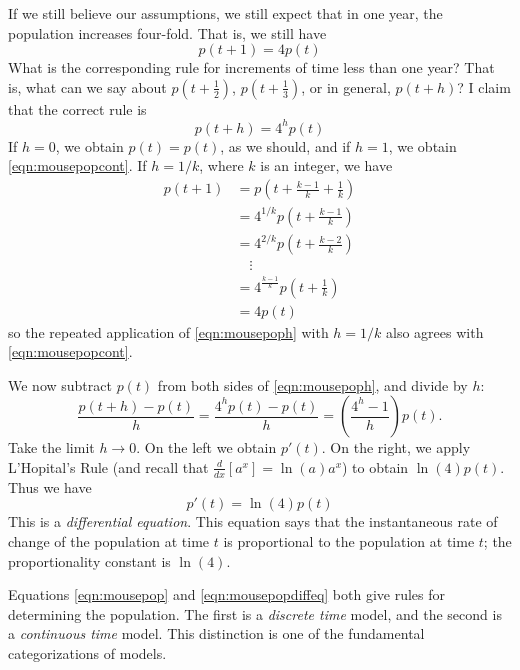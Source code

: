\documentclass[reqno]{immbook}
\numberwithin{equation}{chapter}
\numberwithin{question}{section}
\numberwithin{theorem}{chapter}
\numberwithin{figure}{chapter}
\theoremstyle{definition}
\begin{document}
If we still believe our assumptions,
we still expect that in one year, the population
increases four-fold.
That is, we still have
\begin{equation}
    p(t+1) = 4p(t)
\label{eqn:mousepopcont}
\end{equation}
What is the corresponding rule for increments of
time less than one year? That is, what can we
say about $p(t+\frac{1}{2})$, $p(t+\frac{1}{3})$,
or in general, $p(t+h)$?
I claim that the correct rule is
\begin{equation}
   p(t+h) = 4^{h}p(t)
\label{eqn:mousepoph}
\end{equation}
If $h=0$, we obtain $p(t)=p(t)$, as we should, and if
$h=1$, we obtain \eqref{eqn:mousepopcont}.
If $h=1/k$, where $k$ is an integer, we have
\begin{equation}
\begin{split}
   p(t+1) & = p(t+\frac{k-1}{k} + \frac{1}{k}) \\
          & = 4^{1/k}p(t+\frac{k-1}{k}) \\
	  & = 4^{2/k}p(t+\frac{k-2}{k}) \\
	  & \quad \vdots \\
	  & = 4^{\frac{k-1}{k}}p(t+\frac{1}{k}) \\
	  & = 4p(t)
\end{split}
\end{equation}
so the repeated application of \eqref{eqn:mousepoph}
with $h=1/k$ also agrees with \eqref{eqn:mousepopcont}.

We now subtract $p(t)$ from both sides of
\eqref{eqn:mousepoph}, and divide by $h$:
\begin{equation}
   \frac{p(t+h) - p(t)}{h} =
     \frac{4^{h} p(t) - p(t)}{h} = \left(\frac{4^h-1}{h}\right)p(t).
\end{equation}
Take the limit $h\rightarrow 0$.
On the left we obtain $p'(t)$.
On the right, we apply L'Hopital's Rule
(and recall that $\frac{d}{dx}\left[a^x\right] = \ln(a)a^x$)
to obtain $\ln(4)p(t)$.
Thus we have
\begin{equation}
   p'(t) = \ln(4)p(t)
\label{eqn:mousepopdiffeq}
\end{equation}
This is a \emph{differential equation}.
This equation says that the
instantaneous rate of change of the population
at time $t$ is proportional to the population at time $t$;
the proportionality constant is $\ln(4)$.

Equations \eqref{eqn:mousepop} and
\eqref{eqn:mousepopdiffeq} both give rules
for determining the population.
The first is a \emph{discrete time} model,
and the second is a \emph{continuous time}
model.
This distinction is one of the fundamental
categorizations of models.
\end{document}
